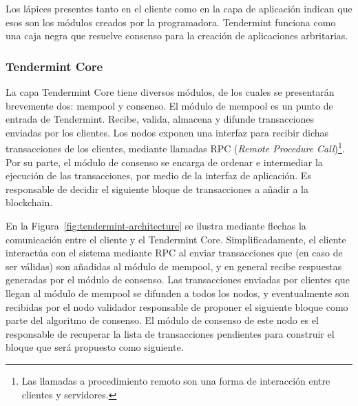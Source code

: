 Los lápices presentes tanto en el cliente como en la capa de aplicación indican que esos son los módulos creados
por la programadora.
%
Tendermint funciona como una caja negra que resuelve consenso para la creación de aplicaciones arbritarias.
%

\subsubsection{Tendermint Core}

La capa Tendermint Core tiene diversos módulos, de los cuales se presentarán brevemente dos: mempool y consenso.
%
El módulo de mempool es un punto de entrada de Tendermint.
%
Recibe, valida, almacena y difunde transacciones enviadas por los clientes. 
%
%
Los nodos exponen una interfaz para recibir dichas transacciones de los clientes, mediante llamadas
RPC (\textit{Remote Procedure Call})\footnote{Las llamadas a procedimiento remoto son una forma de
interacción entre clientes y servidores.}.
%
%
%
Por su parte, el módulo de consenso se encarga de ordenar e intermediar la ejecución de las transacciones, por medio de la
interfaz de aplicación. Es responsable de decidir el siguiente bloque de transacciones a añadir a la blockchain.

En la Figura~\ref{fig:tendermint-architecture} se ilustra mediante flechas la comunicación
entre el cliente y el Tendermint Core.
Simplificadamente, el cliente interactúa con el sistema mediante RPC al enviar transacciones
que (en caso de ser válidas) son añadidas al módulo de mempool,
y en general recibe respuestas generadas por el módulo de consenso.
Las transacciones enviadas por clientes que llegan al módulo de mempool se difunden a todos los nodos, y eventualmente son recibidas
por el nodo validador responsable de proponer el siguiente bloque como parte del algoritmo de consenso.
El módulo de consenso de este nodo es el responsable de recuperar la lista de transacciones pendientes
para construir el bloque que será propuesto como siguiente. 


